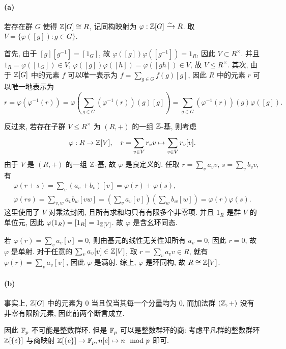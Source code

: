 \documentclass{article}
\begin{document}
\begin{solution}
	\paragraph{(a)} 若存在群 $G$ 使得 $\mathbb{Z}[G] \cong R$, 记同构映射为 $\varphi: \mathbb{Z}[G] \xrightarrow{\sim} R$. 取 $V = \{\varphi([g]): g \in G\}$. 
	
	首先, 由于 $[g][g^{-1}] = [1_G]$, 故 $\varphi([g]) \varphi([g^{-1}]) = 1_R$, 因此 $V \subset R^\times$. 并且 $1_R = \varphi([1_G]) \in V$, $\varphi([g])\varphi([h]) = \varphi([gh]) \in V$, 故 $V \le R^\times$. 其次, 由于 $\mathbb{Z}[G]$ 中的元素 $f$ 可以唯一表示为 $f = \sum_{g \in G}^{}f(g) [g]$, 因此 $R$ 中的元素 $r$ 可以唯一地表示为
	\[ r = \varphi(\varphi^{-1}(r)) = \varphi \left( \sum_{g \in G}^{}(\varphi^{-1}(r))(g)[g] \right) = \sum_{g \in G}^{}(\varphi^{-1}(r))(g) \varphi([g]). \]
	
	反过来, 若存在子群 $V \le R^\times$ 为 $(R, +)$ 的一组 $\mathbb{Z}$-基, 则考虑 \[ \varphi: R \to \mathbb{Z}[V], \quad r = \sum_{v \in V}^{}r_v v \mapsto \sum_{v \in V}^{}r_v [v]. \]
	由于 $V$ 是 $(R, +)$ 的一组 $\mathbb{Z}$-基, 故 $\varphi$ 是良定义的. 任取 $r = \sum_v a_vv$, $s = \sum_v b_vv$, 有
	\begin{gather*}
		\varphi(r + s) = \sum_v(a_v + b_v)[v] = \varphi(r) + \varphi(s), \\
		\varphi(rs) = \sum_{v,w}a_vb_w[vw]
		= \left(\sum_v a_v[v]\right)\left(\sum_w b_w[w]\right)
		= \varphi(r)\varphi(s).
	\end{gather*}
	这里使用了 $V$ 对乘法封闭, 且所有求和均只有有限多个非零项. 并且 $1_R$ 是群 $V$ 的单位元, 因此 $\varphi(1_R) = [1_R] = 1_{\mathbb{Z}[V]}$. 故 $\varphi$ 是含幺环同态.

	若 $\varphi(r) = \sum_v a_v[v] = 0$, 则由基元的线性无关性知所有 $a_v = 0$, 因此 $r = 0$, 故 $\varphi$ 是单射. 对于任意的 $\sum_v a_v[v] \in \mathbb{Z}[V]$, 取 $r = \sum_v a_vv \in R$, 就有 $\varphi(r) = \sum_v a_v[v]$, 因此 $\varphi$ 是满射. 综上, $\varphi$ 是环同构, 故 $R \cong \mathbb{Z}[V]$.

	\paragraph{(b)} 事实上, $\mathbb{Z}[G]$ 中的元素为 $0$ 当且仅当其每一个分量均为 $0$, 而加法群 $(\mathbb{Z}, +)$ 没有非零有限阶元素, 因此前两个断言成立.

	因此 $\mathbb{F}_p$ 不可能是整数群环. 但是 $\mathbb{F}_p$ 可以是整数群环的商: 考虑平凡群的整数群环 $\mathbb{Z}[\{e\}]$ 与商映射 $\mathbb{Z}[\{e\}] \to \mathbb{F}_p, n[e] \mapsto n \mod p$ 即可.


\end{solution}
\end{document}

